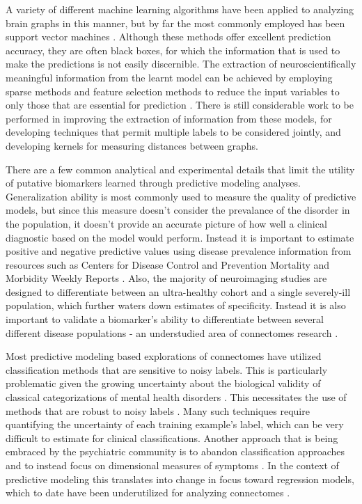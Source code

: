 A variety of different machine learning algorithms have been applied to analyzing brain graphs in this manner, but by far the most commonly employed has been support vector machines \cite{Castellanos2013}. Although these methods  offer excellent prediction accuracy, they are often black boxes, for which the information that is used to make the predictions is not easily discernible. The extraction of neuroscientifically meaningful information from the learnt model can be achieved by employing sparse methods \cite{Ryali2010} and feature selection methods \cite{Craddock2009} to reduce the input variables to only those that are essential for prediction \cite{Varoquaux2013}.  There is still considerable work to be performed in improving the extraction of information from these models, for developing techniques that permit multiple labels to be considered jointly, and developing kernels for measuring distances between graphs.

There are a few common analytical and experimental details that limit the utility of putative biomarkers learned through predictive modeling analyses.  Generalization ability is most commonly used to measure the quality of predictive models, but since this measure doesn't consider the prevalance of the disorder in the population, it doesn't provide an accurate picture of how well a clinical diagnostic based on the model would perform. Instead it is important to estimate positive and negative predictive values \cite{Grimes2002,Altman1994} using disease prevalence information from resources such as Centers for Disease Control and Prevention Mortality and Morbidity Weekly Reports \cite{CDCMMWR}. Also, the majority of neuroimaging studies are designed to differentiate between an ultra-healthy cohort and a single severely-ill population, which further waters down estimates of specificity. Instead it is also important to validate a biomarker's ability to differentiate between several different disease populations - an understudied area of connectomes research \cite{Kapur2012}. 

Most predictive modeling based explorations of connectomes have utilized classification methods that are sensitive to noisy labels. This is particularly problematic given the growing uncertainty about the biological validity of classical categorizations of mental health disorders \cite{Kapur2012}. This necessitates the use of methods that are robust to noisy labels \cite{Lugosi1992,Scott2013}. Many such techniques require quantifying the uncertainty of each training example's label, which can be very difficult to estimate for clinical classifications. Another approach that is being embraced by the psychiatric community is to abandon classification approaches and to instead focus on dimensional measures of symptoms \cite{Insel2010}. In the context of predictive modeling this translates into change in focus toward regression models, which to date have been underutilized for analyzing connectomes \cite{Castellanos2013}. 

